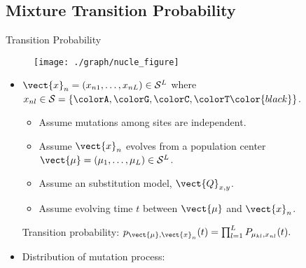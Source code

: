 \documentclass{beamer}
\begin{document}

\subsection{Mixture Transition Probability}

\begin{frame}{Transition Probability}

\vspace{-0.3cm}
\begin{figure}
\centering
  \texttt{[image: ./graph/nucle\_figure]}
\end{figure}

\vspace{-0.4cm}
\begin{itemize}
\item
$\vect{x}_n = (x_{n1}, \ldots, x_{nL}) \in \mathcal{S}^L$ where
$x_{nl} \in \mathcal{S} = \{\colorA, \colorG, \colorC, \colorT \color{black} \}$. \\

\begin{itemize}
\item Assume mutations among sites are independent.

\item Assume $\vect{x}_n$ evolves from a population center
      $\vect{\mu} = (\mu_1,\ldots, \mu_L) \in \mathcal{S}^L$.

\item Assume an substitution model, $\vect{Q}_{x,y}$.

\item Assume evolving time $t$ between $\vect{\mu}$ and $\vect{x}_n$.
\end{itemize}
Transition probability:
$
p_{\vect{\mu},\vect{x}_n}(t)
= \prod_{l = 1}^L P_{\mu_{kl}, x_{nl}}(t).
$

\item
Distribution of mutation process:
\begin{center}
\end{center}

\end{itemize}

\end{frame}

\end{document}
